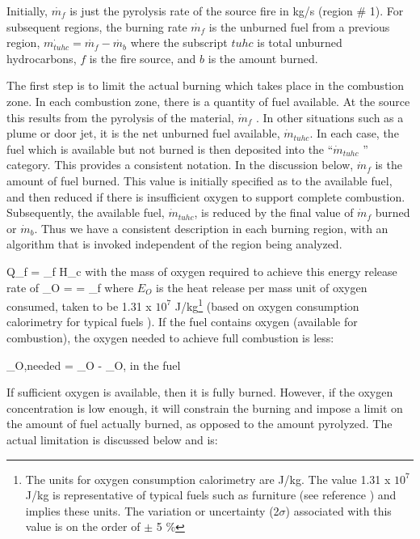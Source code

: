 Initially, $\dot{m_f}$ is just the pyrolysis rate of the source fire in kg/s (region \# 1). For subsequent regions, the burning rate $\dot{m_f}$ is the unburned fuel from a previous region, $\dot{m_{tuhc}} = \dot{m_f} - \dot{m_b}$ where the subscript $tuhc$ is total unburned hydrocarbons, $f$ is the fire source, and $b$ is the amount burned.

The first step is to limit the actual burning which takes place in the combustion zone.  In each
combustion zone, there is a quantity of fuel available.  At the source this results from the
pyrolysis of the material, $\dot{m}_f$ .  In other situations such as a plume or door jet, it is the net
unburned fuel available, $\dot{m}_{tuhc}$.  In each case, the fuel which is available but not burned is then
deposited into the ``$\dot{m}_{tuhc}$ '' category.  This provides a consistent notation.  In the discussion below,
$\dot{m}_f$  is the amount of fuel burned.  This value is initially specified as to the available fuel, and then
reduced if there is insufficient oxygen to support complete combustion.  Subsequently, the
available fuel, $\dot{m}_{tuhc}$, is reduced by the final value of $\dot{m}_f$ burned or $\dot{m}_b$.  Thus we have a consistent description in each burning region, with an algorithm that is invoked independent of the region being analyzed.

\be Q_f = _f H_c \ee
with the mass of oxygen required to achieve this energy release rate of
\be {}_O =  = _f  \ee
where $E_O$ is the heat release per mass unit of oxygen consumed, taken to be 1.31 x $10^7$ J/kg\footnote{The units for oxygen consumption calorimetry are J/kg. The value 1.31 x $10^7$ J/kg is representative of typical fuels such as furniture (see reference \cite{Morehart:1991}) and implies these units. The variation or uncertainty (2$\sigma$) associated with this value is on the order of $\pm$ 5 \%} (based
on oxygen consumption calorimetry for typical fuels \cite{Morehart:1991, Thornton:1917, Huggett:1980}). If the fuel contains oxygen (available for combustion), the oxygen needed to achieve full combustion is less:

\be {}_{O,needed} = _O - _{O, in the fuel} \ee

If sufficient oxygen is available, then it is fully burned.  However, if the oxygen concentration is
low enough, it will constrain the burning and impose a limit on the amount of fuel actually
burned, as opposed to the amount pyrolyzed.  The actual limitation is discussed below and is:

